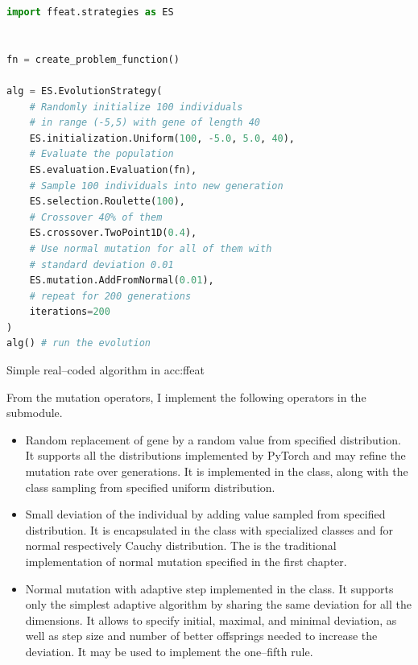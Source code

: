 \begin{algorithm}[b!]
\begin{lstlisting}[language=Python, xrightmargin=18pt]
import ffeat.strategies as ES


fn = create_problem_function()

alg = ES.EvolutionStrategy(
    # Randomly initialize 100 individuals 
    # in range (-5,5) with gene of length 40
    ES.initialization.Uniform(100, -5.0, 5.0, 40),
    # Evaluate the population
    ES.evaluation.Evaluation(fn),
    # Sample 100 individuals into new generation
    ES.selection.Roulette(100),
    # Crossover 40% of them
    ES.crossover.TwoPoint1D(0.4),
    # Use normal mutation for all of them with 
    # standard deviation 0.01
    ES.mutation.AddFromNormal(0.01),
    # repeat for 200 generations
    iterations=200
)
alg() # run the evolution
\end{lstlisting}
\caption{Simple real--coded algorithm in \acrshort*{acc:ffeat}}
\label{alg:esffeat}
\end{algorithm}

From the mutation operators, I implement the following operators in the  submodule.
\begin{itemize}
    \item Random replacement of gene by a random value from specified distribution. It supports all the distributions implemented by PyTorch \citep{PyTorchDoc} and may refine the mutation rate over generations. It is implemented in the  class, along with the  class sampling from specified uniform distribution.
    \item Small deviation of the individual by adding value sampled from specified distribution. It is encapsulated in the  class with specialized classes  and  for normal respectively Cauchy distribution. The  is the traditional implementation of normal mutation specified in the first chapter.
    \item Normal mutation with adaptive step implemented in the  class. It supports only the simplest adaptive algorithm by sharing the same deviation for all the dimensions. It allows to specify initial, maximal, and minimal deviation, as well as step size and number of better offsprings needed to increase the deviation. It may be used to implement the one--fifth rule.
\end{itemize}

